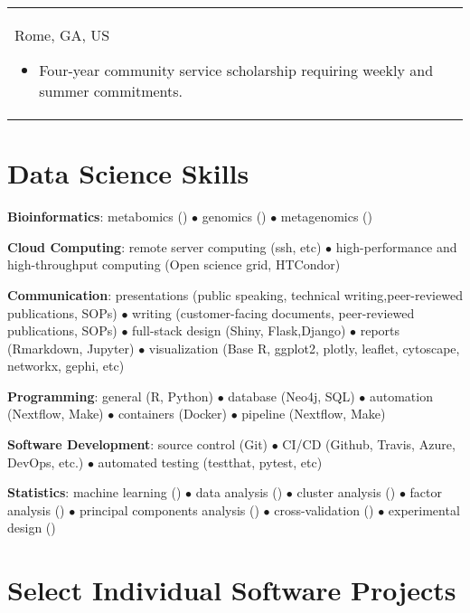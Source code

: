 \documentclass[10pt,a4paper,]{article}
\begin{document}
\begin{longtable}{@{\extracolsep{\fill}}ll}
{  \footnotesize Rome, GA, US\par%
  \normalsize \vspace{0.1cm}\begin{minipage}{0.7\textwidth}%
\begin{itemize}[leftmargin=*]%
\item Four-year community service scholarship requiring weekly and summer commitments.%
\end{itemize}%
\end{minipage}%
\vspace{1.5\parsep}}\\
\end{longtable}
\newpage

\hypertarget{data-science-skills}{%
\section{Data Science Skills}\label{data-science-skills}}

\textbf{Bioinformatics}: metabomics () \(\bullet\) genomics ()
\(\bullet\) metagenomics ()

\textbf{Cloud Computing}: remote server computing (ssh, etc) \(\bullet\)
high-performance and high-throughput computing (Open science grid,
HTCondor)

\textbf{Communication}: presentations (public speaking, technical
writing,peer-reviewed publications, SOPs) \(\bullet\) writing
(customer-facing documents, peer-reviewed publications, SOPs)
\(\bullet\) full-stack design (Shiny, Flask,Django) \(\bullet\) reports
(Rmarkdown, Jupyter) \(\bullet\) visualization (Base R, ggplot2, plotly,
leaflet, cytoscape, networkx, gephi, etc)

\textbf{Programming}: general (R, Python) \(\bullet\) database (Neo4j,
SQL) \(\bullet\) automation (Nextflow, Make) \(\bullet\) containers
(Docker) \(\bullet\) pipeline (Nextflow, Make)

\textbf{Software Development}: source control (Git) \(\bullet\) CI/CD
(Github, Travis, Azure, DevOps, etc.) \(\bullet\) automated testing
(testthat, pytest, etc)

\textbf{Statistics}: machine learning () \(\bullet\) data analysis ()
\(\bullet\) cluster analysis () \(\bullet\) factor analysis ()
\(\bullet\) principal components analysis () \(\bullet\)
cross-validation () \(\bullet\) experimental design ()

\hypertarget{select-individual-software-projects}{%
\section{Select Individual Software
Projects}\label{select-individual-software-projects}}
\end{document}
